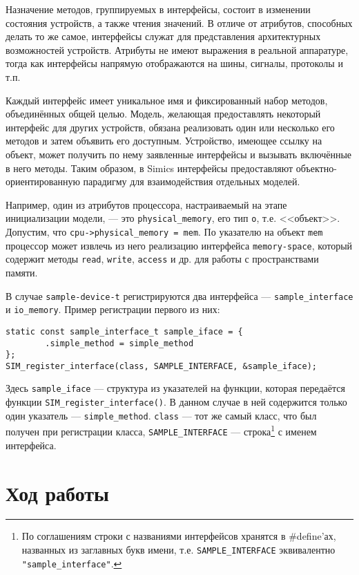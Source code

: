 Назначение методов, группируемых в интерфейсы, состоит в изменении состояния устройств, а также чтения значений. В отличе от атрибутов, способных делать то же самое, интерфейсы служат для представления архитектурных возможностей устройств. Атрибуты не имеют выражения в реальной аппаратуре, тогда как интерфейсы напрямую отображаются на шины, сигналы, протоколы и т.п.

Каждый интерфейс имеет уникальное имя и фиксированный набор методов, объединённых общей целью. Модель, желающая предоставлять некоторый интерфейс для других устройств, обязана реализовать один или несколько его методов и затем объявить его доступным. Устройство, имеющее ссылку на объект, может получить по нему заявленные интерфейсы и вызывать включённые в него методы. Таким образом, в Simics интерфейсы предоставляют объектно-ориентированную парадигму для взаимодействия отдельных моделей.

Например, один из атрибутов процессора, настраиваемый на этапе инициализации модели, --- это \texttt{physical_memory}, его тип \texttt{o}, т.е. <<объект>>. Допустим, что \texttt{cpu->physical_memory = mem}. По указателю на объект \texttt{mem} процессор может извлечь из него реализацию интерфейса \texttt{memory-space}, который содержит методы \texttt{read}, \texttt{write}, \texttt{access} и др. для работы с пространствами памяти.

В случае \texttt{sample-device-t} регистрируются два интерфейса --- \texttt{sample_interface}  и \texttt{io_memory}.
Пример регистрации первого из них:
\begin{lstlisting}
static const sample_interface_t sample_iface = {
        .simple_method = simple_method
};
SIM_register_interface(class, SAMPLE_INTERFACE, &sample_iface);
\end{lstlisting}

Здесь \texttt{sample_iface} --- структура из указателей на функции, которая передаётся функции \texttt{SIM_register_interface()}. В данном случае в ней содержится только один указатель --- \texttt{simple_method}.  \texttt{class} --- тот же самый класс, что был получен при регистрации класса, \texttt{SAMPLE_INTERFACE} --- строка\footnote{По соглашениям строки с названиями интерфейсов хранятся в \#define'ах, названных из заглавных букв имени, т.е. \texttt{SAMPLE_INTERFACE} эквивалентно \texttt{"sample_interface"}.} с именем интерфейса.

\section{Ход работы}

